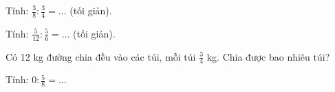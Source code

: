 \begin{ex}
Tính: $\frac{3}{8} : \frac{3}{4} = \dots$ (tối giản).
\end{ex}

\begin{ex}
Tính: $\frac{5}{12} : \frac{5}{6} = \dots$ (tối giản).
\end{ex}

\begin{ex}
Có 12 kg đường chia đều vào các túi, mỗi túi $\frac{3}{4}$ kg. Chia được bao nhiêu túi?
\end{ex}

\begin{ex}
Tính: $0 : \frac{5}{8} = \dots$
\end{ex}
